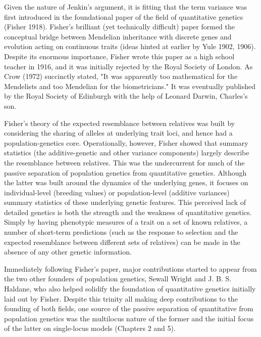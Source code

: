 \documentclass{article}
\begin{document}
Given the nature of Jenkin's argument, it is fitting that the term variance was first introduced in the foundational paper of the field of quantitative genetics (Fisher 1918). Fisher's brilliant (yet technically difficult) paper formed the conceptual bridge between Mendelian inheritance with discrete genes and evolution acting on continuous traits (ideas hinted at earlier by Yule 1902, 1906). Despite its enormous importance, Fisher wrote this paper as a high school teacher in 1916, and it was initially rejected by the Royal Society of London. As Crow (1972) succinctly stated, "It was apparently too mathematical for the Mendelists and too Mendelian for the biometricians." It was eventually published by the Royal Society of Edinburgh with the help of Leonard Darwin, Charles's son.

Fisher’s theory of the expected resemblance between relatives was built by considering the sharing of alleles at underlying trait loci, and hence had a population-genetics core. Operationally, however, Fisher showed that summary statistics (the additive-genetic and other variance components) largely describe the resemblance between relatives. This was the undercurrent for much of the passive separation of population genetics from quantitative genetics. Although the latter was built around the dynamics of the underlying genes, it focuses on individual-level (breeding values) or population-level (additive variances) summary statistics of these underlying genetic features. This perceived lack of detailed genetics is both the strength and the weakness of quantitative genetics. Simply by having phenotypic measures of a trait on a set of known relatives, a number of short-term predictions (such as the response to selection and the expected resemblance between different sets of relatives) can be made in the absence of any other genetic information.

Immediately following Fisher's paper, major contributions started to appear from the two other founders of population genetics, Sewall Wright and J. B. S. Haldane, who also helped solidify the foundation of quantitative genetics initially laid out by Fisher. Despite this trinity all making deep contributions to the founding of both fields, one source of the passive separation of quantitative from population genetics was the multilocus nature of the former and the initial focus of the latter on single-locus models (Chapters 2 and 5).
\end{document}
